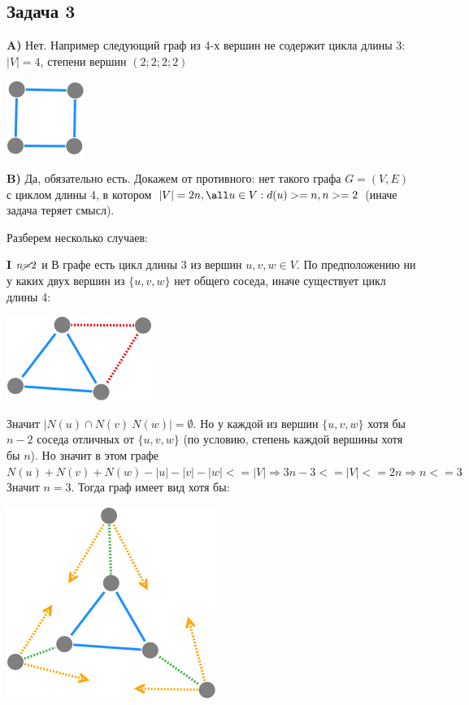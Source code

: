 \documentclass{article}
\begin{document}
\begin{center}
	\subsection*{Задача 3}
\end{center}

\textbf{A)} Нет. Например следующий граф из 4-х вершин не содержит цикла длины 3:
$|V| = 4$, степени вершин $(2;2;2;2)$

\includegraphics[scale=0.5]{3_1.png}

\textbf{B)} Да, обязательно есть. Докажем от противного: нет такого графа $ G = (V, E) $ с циклом длины 4, в котором $ |V| = 2n, \space \all u \in V: d(u) >= n, n >= 2 $ (иначе задача теряет смысл).

Разберем несколько случаев:

\textbf{I} 
$n \cancel{=} 2$ и В графе есть цикл длины 3 из вершин $ u, v, w \in V$. По предположению ни у каких двух вершин из $\{u, v, w\}$ нет общего соседа, иначе существует цикл длины 4:

\includegraphics[scale=0.5]{3_2.png}

Значит $|N(u) \cap N(v) \ N(w)| = \emptyset$. Но у каждой из вершин $\{u, v, w\}$ хотя бы $n - 2$ соседа отличных от $\{u, v, w\}$ (по условию, степень каждой вершины хотя бы $n$). Но значит в этом графе $N(u) + N(v) + N(w) - |{u}| - |{v}| - |{w}| <= |V| \Rightarrow 3n - 3 <= |V| <= 2n \Rightarrow n <= 3$
Значит $n = 3$. Тогда граф имеет вид хотя бы:

\includegraphics[scale=0.5]{3_3.png}
 
\end{document}

